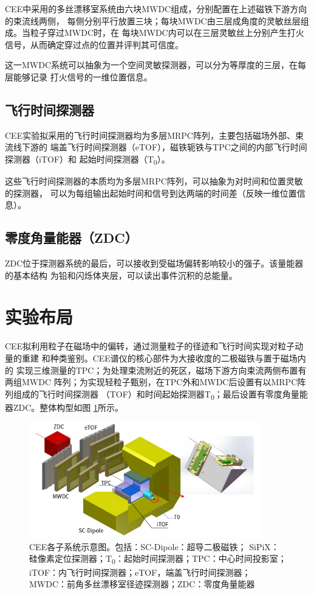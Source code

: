 \documentclass[bachelor,openany,oneside,color]{buaathesis}
\def\TZ{T\textsubscript{0}}
\begin{document}
CEE中采用的多丝漂移室系统由六块MWDC组成，分别配置在上述磁铁下游方向的束流线两侧，
每侧分别平行放置三块；每块MWDC由三层成角度的灵敏丝层组成。当粒子穿过MWDC时，在
每块MWDC内可以在三层灵敏丝上分别产生打火信号，从而确定穿过点的位置并评判其可信度。

这一MWDC系统可以抽象为一个空间灵敏探测器，可以分为等厚度的三层，在每层能够记录
打火信号的一维位置信息。

\subsection{飞行时间探测器}

CEE实验拟采用的飞行时间探测器均为多层MRPC阵列，主要包括磁场外部、束流线下游的
端盖飞行时间探测器（eTOF），磁铁轭铁与TPC之间的内部飞行时间探测器（iTOF）和
起始时间探测器（\TZ）。

这些飞行时间探测器的本质均为多层MRPC阵列，可以抽象为对时间和位置灵敏的探测器，
可以为每组输出起始时间和信号到达两端的时间差（反映一维位置信息）。

\subsection{零度角量能器（ZDC）}

ZDC位于探测器系统的最后，可以接收到受磁场偏转影响较小的强子。该量能器的基本结构
为铅和闪烁体夹层，可以读出事件沉积的总能量。

\section{实验布局}

CEE拟利用粒子在磁场中的偏转，通过测量粒子的径迹和飞行时间实现对粒子动量的重建
和种类鉴别。\cite{技术文档}CEE谱仪的核心部件为大接收度的二极磁铁与置于磁场内的
实现三维测量的TPC；为处理束流附近的死区，磁场下游方向束流两侧布置有两组MWDC
阵列；为实现轻粒子甄别，在TPC外和MWDC后设置有以MRPC阵列组成的飞行时间探测器
（TOF）和时间起始探测器\TZ；最后设置有零度角量能器ZDC。整体构型如图
\ref{fig:CEE:Subsystem}所示。

\begin{figure}\centering
	\includegraphics[width=0.9\textwidth]{./resource/CEE-Subsystem.png}
	\captionsetup{width=0.9\textwidth}
	\caption{CEE各子系统示意图。包括：SC-Dipole：超导二极磁铁；
		SiPiX：硅像素定位探测器；\TZ：起始时间探测器；TPC：中心时间投影室；
		iTOF：内飞行时间探测器；eTOF，端盖飞行时间探测器；
		MWDC：前角多丝漂移室径迹探测器；ZDC：零度角量能器}
	\label{fig:CEE:Subsystem}
\end{figure}
\end{document}
